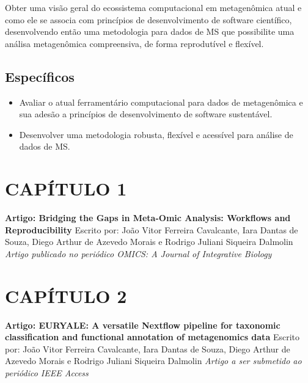 \documentclass[
	12pt,				%
	oneside,			%
	a4paper,			%
	chapter=TITLE,		%
	section=TITLE,		%
	english,			%
	brazil				%
	]{abntex2}
\begin{document}
Obter uma visão geral do ecossistema computacional em metagenômica atual e como ele se associa
com princípios de desenvolvimento de software científico, desenvolvendo então uma metodologia
para dados de \gls{MS} que possibilite uma análisa metagenômica compreensiva, de forma reprodutível e flexível.

\section{Específicos}\label{especuxedficos}
\begin{itemize}
\tightlist
\item
  Avaliar o atual ferramentário computacional para dados de metagenômica e sua adesão a princípios de desenvolvimento de software sustentável.
\item
  Desenvolver uma metodologia robusta, flexível e acessível para análise de dados de \gls{MS}.
\end{itemize}
\chapter*{CAPÍTULO 1}\label{cap1}
\begin{center}
\textbf{Artigo: Bridging the Gaps in Meta-Omic Analysis: Workflows and Reproducibility}
\bigskip\newline
Escrito por: João Vitor Ferreira Cavalcante, Iara Dantas de Souza, Diego Arthur de Azevedo Morais e Rodrigo Juliani Siqueira Dalmolin
\bigskip\newline
\textit{Artigo publicado no periódico OMICS: A Journal of Integrative Biology}

\end{center}
\begin{fichacatalografica}
    
\end{fichacatalografica}
\chapter*{CAPÍTULO 2}\label{cap2}
\begin{center}
\textbf{Artigo: EURYALE: A versatile Nextflow pipeline for taxonomic classification and functional annotation of metagenomics data}
\bigskip\newline
Escrito por: João Vitor Ferreira Cavalcante, Iara Dantas de Souza, Diego Arthur de Azevedo Morais e Rodrigo Juliani Siqueira Dalmolin
\bigskip\newline
\textit{Artigo a ser submetido ao periódico IEEE Access}

\end{center}
\begin{fichacatalografica}
    
\end{fichacatalografica}
\end{document}
